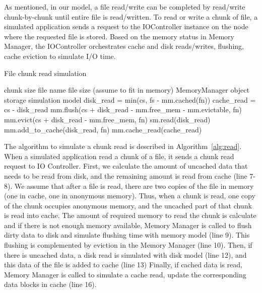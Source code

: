 \documentclass[conference]{IEEEtran}
\newcommand{\Desc}[2]{\State \makebox[2em][l]{#1}#2}
\begin{document}
			As mentioned, in our model, a file read/write can be completed by read/write 
			chunk-by-chunk until entire file is read/written.
			To read or write a chunk of file, a simulated application sends a request to the 
			IOController instance on the node where the requested file is stored.
			Based on the memory status in Memory Manager, the IOController 
			orchestrates cache and disk reads/writes, flushing, cache eviction 
			to simulate I/O time.
			
			\begin{algorithm}\caption{File chunk read simulation}\label{alg:read}
				\small
				\begin{algorithmic}[1]
					\Input
        				\Desc{cs}{chunk size}
        				\Desc{fn}{file name}
        				\Desc{fs}{file size (assume to fit in memory)}
						\Desc{mm}{MemoryManager object}
						\Desc{sm}{storage simulation model}
   					\EndInput
   					\State disk\_read = min(cs, fs - mm.cached(fn))
   					\State cache\_read = cs - disk\_read
					\State mm.flush(cs + disk\_read - mm.free\_mem - mm.evictable, fn) 
					\State mm.evict(cs + disk\_read - mm.free\_mem, fn) 
					  	
						\State sm.read(disk\_read)  
						\State mm.add\_to\_cache(disk\_read, fn) 	
					\EndIf
					 
						\State mm.cache\_read(cache\_read)  
					\EndIf
				\end{algorithmic}
			\end{algorithm}			
			
			The algorithm to simulate a chunk read is described in Algorithm~\ref{alg:read}.   
			When a simulated application read a chunk of a file, it sends a 
			chunk read request to IO Controller. 
			First, we calculate the amount of uncached data that needs to be read 
			from disk, and the remaining amount is read from cache (line 7-8).
			We assume that after a file is read, there are two copies of the file in memory 
			(one in cache, one in anonymous memory). 
			Thus, when a chunk is read, one copy of the chunk occupies anonymous memory, 
			and the uncached part of that chunk is read into cache.	
			The amount of required memory to read the chunk is calculate and 
			if there is not enough memory available, Memory Manager is called to 
			flush dirty data to disk and simulate flushing time with memory model (line 9).
			This flushing is complemented by eviction in the Memory Manager (line 10). 
			Then, if there is uncached data, a disk read is simulated with disk model (line 12), 
			and this data of the file is added to cache (line 13)
			Finally, if cached data is read, Memory Manager is called to simulate a cache read, 
			update the corresponding data blocks in cache (line 16). 
\end{document}
